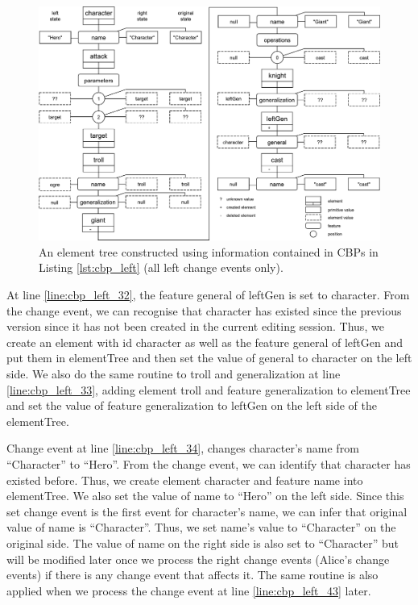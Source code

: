 \begin{figure}[ht]
  \centering
  \includegraphics[width=\linewidth]{element_tree_game_left}
  \caption{An element tree constructed using information contained in CBPs in Listing \ref{lst:cbp_left} (all left change events only).}
  \label{fig:left_element_tree_diagram}
\end{figure} 

At line \ref{line:cbp_left_32}, the feature \textsf{general} of \textsf{leftGen} is set to \textsf{character}. From the change event, we can recognise that \textsf{character} has existed since the previous version since it has not been created in the current editing session. Thus, we create an element with id \textsf{character} as well as the feature \textsf{general} of \textsf{leftGen} and put them in \textsf{elementTree} and then set the value of \textsf{general} to \textsf{character} on the left side. We also do the same routine to \textsf{troll} and \textsf{generalization} at line \ref{line:cbp_left_33}, adding element \textsf{troll} and feature \textsf{generalization} to \textsf{elementTree} and set the value of feature \textsf{generalization} to \textsf{leftGen} on the left side of the \textsf{elementTree}. 

Change event at line \ref{line:cbp_left_34}, changes \textsf{character}'s \textsf{name} from ``Character'' to ``Hero''. From the change event, we can identify that \textsf{character} has existed before. Thus, we create element \textsf{character} and feature \textsf{name} into \textsf{elementTree}. We also set the value of \textsf{name} to ``Hero'' on the left side. Since this set change event is the first event for \textsf{character}'s \textsf{name}, we can infer that original value of \textsf{name} is ``Character''. Thus, we set \textsf{name}'s value to ``Character'' on the original side. The value of \textsf{name} on the right side is also set to ``Character'' but will be modified later once we process the right change events (Alice's change events) if there is any change event that affects it. The same routine is also applied when we process the change event at line \ref{line:cbp_left_43} later.

